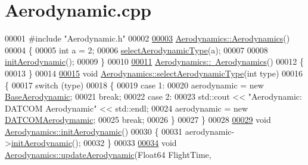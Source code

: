 \hypertarget{_aerodynamic_8cpp_source}{}\section{Aerodynamic.\+cpp}
\label{_aerodynamic_8cpp_source}

\begin{DoxyCode}
00001 \textcolor{preprocessor}{#include "Aerodynamic.h"}
00002 
\hyperlink{group___aerodynamic_a36c7ae850ce18605cdbf3ce1709d8e54}{00003} \hyperlink{group___aerodynamic_a36c7ae850ce18605cdbf3ce1709d8e54}{Aerodynamics::Aerodynamics}()
00004 \{
00005     \textcolor{keywordtype}{int} a = 2;
00006     \hyperlink{group___aerodynamic_a9aa3397e8b1d91ed237146a57bbe6bcf}{selectAerodynamicType}(a);
00007 
00008     \hyperlink{group___aerodynamic_a2382a1b24c0b3948629103747cce3db1}{initAerodynamic}();
00009 \}
00010 
\hyperlink{group___aerodynamic_af0e048e0c80ec8334997b79b761fea60}{00011} \hyperlink{group___aerodynamic_af0e048e0c80ec8334997b79b761fea60}{Aerodynamics::~Aerodynamics}()
00012 \{
00013 \}
00014 
\hyperlink{group___aerodynamic_a9aa3397e8b1d91ed237146a57bbe6bcf}{00015} \textcolor{keywordtype}{void} \hyperlink{group___aerodynamic_a9aa3397e8b1d91ed237146a57bbe6bcf}{Aerodynamics::selectAerodynamicType}(\textcolor{keywordtype}{int} type)
00016 \{
00017     \textcolor{keywordflow}{switch} (type)
00018     \{
00019     \textcolor{keywordflow}{case} 1:
00020         aerodynamic = \textcolor{keyword}{new} \hyperlink{group___aerodynamic_class_base_aerodynamic}{BaseAerodynamic};
00021         \textcolor{keywordflow}{break};
00022     \textcolor{keywordflow}{case} 2:
00023         std::cout << \textcolor{stringliteral}{"Aerodynamic: DATCOM Aerodynamic"} << std::endl;
00024         aerodynamic = \textcolor{keyword}{new} \hyperlink{group___aerodynamic_class_d_a_t_c_o_m_aerodymamic}{DATCOMAerodymamic};
00025         \textcolor{keywordflow}{break};
00026     \}
00027 \}
00028 
\hyperlink{group___aerodynamic_a2382a1b24c0b3948629103747cce3db1}{00029} \textcolor{keywordtype}{void} \hyperlink{group___aerodynamic_a2382a1b24c0b3948629103747cce3db1}{Aerodynamics::initAerodynamic}()
00030 \{
00031     aerodynamic->\hyperlink{group___aerodynamic_aaeebe11ae40e87069a13256d1de4f1bb}{initAerodynamic}();
00032 \}
00033 
\hyperlink{group___aerodynamic_adf6047b063022ff3b689e269d2b35863}{00034} \textcolor{keywordtype}{void} \hyperlink{group___aerodynamic_adf6047b063022ff3b689e269d2b35863}{Aerodynamics::updateAerodynamic}(Float64 FlightTime, 

\end{DoxyCode}
